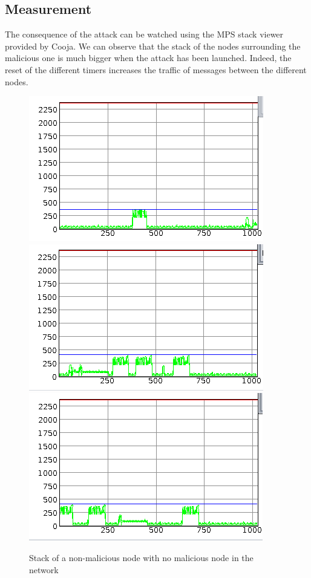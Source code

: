 \documentclass{report}
\begin{document}
\subsection*{Measurement }
The consequence of the attack can be watched using the MPS stack viewer
provided by Cooja. We can observe that the stack of the nodes
surrounding the malicious one is much bigger when the attack has been
launched. Indeed, the reset of the different timers increases the
traffic of messages between the different nodes.\\


\begin{figure}
\includegraphics[scale=0.4]{img/normal_stack2}
\includegraphics[scale=0.4]{img/normal_stack4}
\includegraphics[scale=0.4]{img/normal_stack5}\\
\caption{Stack of a non-malicious node with no malicious node in the network}
\end{figure}
\end{document}
